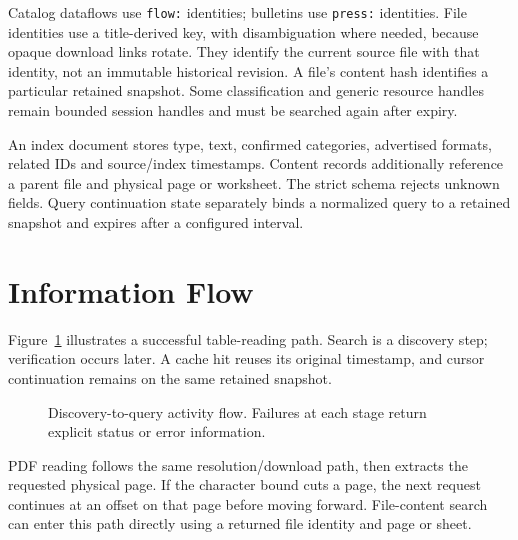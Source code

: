 \documentclass[a4paper,12pt]{report}
\newcommand{\code}[1]{\texttt{\small #1}}
\begin{document}
Catalog dataflows use \code{flow:} identities; bulletins use \code{press:} identities. File identities use a title-derived key, with disambiguation where needed, because opaque download links rotate. They identify the current source file with that identity, not an immutable historical revision. A file's content hash identifies a particular retained snapshot. Some classification and generic resource handles remain bounded session handles and must be searched again after expiry.

An index document stores type, text, confirmed categories, advertised formats, related IDs and source/index timestamps. Content records additionally reference a parent file and physical page or worksheet. The strict schema rejects unknown fields. Query continuation state separately binds a normalized query to a retained snapshot and expires after a configured interval.

\section{Information Flow}
Figure~\ref{fig:flow} illustrates a successful table-reading path. Search is a discovery step; verification occurs later. A cache hit reuses its original timestamp, and cursor continuation remains on the same retained snapshot.

\begin{figure}[H]
\centering
\begingroup\renewcommand{\baselinestretch}{1}\selectfont
{}
\endgroup
\caption{Discovery-to-query activity flow. Failures at each stage return explicit status or error information.}
\label{fig:flow}
\end{figure}

PDF reading follows the same resolution/download path, then extracts the requested physical page. If the character bound cuts a page, the next request continues at an offset on that page before moving forward. File-content search can enter this path directly using a returned file identity and page or sheet.
\end{document}
